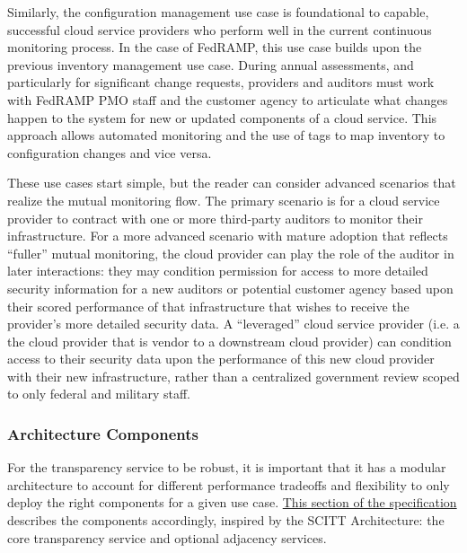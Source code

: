 \documentclass{jdf}
\begin{document}
Similarly, the configuration management use case is foundational to capable, successful cloud service providers who perform well in the current continuous monitoring process. In the case of FedRAMP, this use case builds upon the previous inventory management use case. During annual assessments, and particularly for significant change requests, providers and auditors must work with FedRAMP PMO staff and the customer agency to articulate what changes happen to the system for new or updated components of a cloud service. This approach allows automated monitoring and the use of tags to map inventory to configuration changes and vice versa.

These use cases start simple, but the reader can consider advanced scenarios that realize the mutual monitoring flow. The primary scenario is for a cloud service provider to contract with one or more third-party auditors to monitor their infrastructure. For a more advanced scenario with mature adoption that reflects ``fuller'' mutual monitoring, the cloud provider can play the role of the auditor in later interactions: they may condition permission for access to more detailed security information for a new auditors or potential customer agency based upon their scored performance of that infrastructure that wishes to receive the provider's more detailed security data. A ``leveraged'' cloud service provider (i.e. a the cloud provider that is vendor to a downstream cloud provider) can condition access to their security data upon the performance of this new cloud provider with their new infrastructure, rather than a centralized government review scoped to only federal and military staff.

\subsubsection{Architecture Components}

For the transparency service to be robust, it is important that it has a modular architecture to account for different performance tradeoffs and flexibility to only deploy the right components for a given use case. \href{https://aj-stein.github.io/conmotion/architecture.html#components}{This section of the specification} describes the components accordingly, inspired by the SCITT Architecture: the core transparency service and optional adjacency services.

\end{document}
